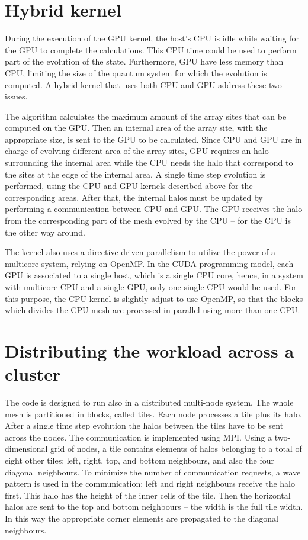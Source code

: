 \section{Hybrid kernel}
During the execution of the GPU kernel, the host's CPU is idle while waiting for the GPU to complete the calculations. This CPU time could be used to perform part of the evolution of the state. Furthermore, GPU have less memory than CPU, limiting the size of the quantum system for which the evolution is computed. A hybrid kernel that uses both CPU and GPU address these two issues.

The algorithm calculates the maximum amount of the array sites that can be computed on the GPU. Then an internal area of the array site, with the appropriate size, is sent to the GPU to be calculated. Since CPU and GPU are in charge of evolving different area of the array sites, GPU requires an halo surrounding the internal area while the CPU needs the halo that correspond to the sites at the edge of the internal area. A single time step evolution is performed, using the CPU and GPU kernels described above for the corresponding areas. After that, the internal halos must be updated by performing a communication between CPU and GPU. The GPU receives the halo from the corresponding part of the mesh evolved by the CPU -- for the CPU is the other way around. 

The kernel also uses a directive-driven parallelism to utilize the power of a multicore system, relying on OpenMP. In the CUDA programming model, each GPU is associated to a single host, which is a single CPU core, hence, in a system with multicore CPU and a single GPU, only one single CPU would be used. For this purpose, the CPU kernel is slightly adjust to use OpenMP, so that the blocks which divides the CPU mesh are processed in parallel using more than one CPU.

\section{Distributing the workload across a cluster}
The code is designed to run also in a distributed multi-node system. The whole mesh is partitioned in blocks, called tiles. Each node processes a tile plus its halo. After a single time step evolution the halos between the tiles have to be sent across the nodes. The communication is implemented using MPI. Using a two-dimensional grid of nodes, a tile contains elements of halos belonging to a total of eight other tiles: left, right, top, and bottom neighbours, and also the four diagonal neighbours. To minimize the number of communication requests, a wave pattern is used in the communication: left and right neighbours receive the halo first. This halo has the height of the inner cells of the tile. Then the horizontal halos are sent to the top and bottom neighbours – the width is the full tile width. In this way the appropriate corner elements are propagated to the diagonal neighbours.

